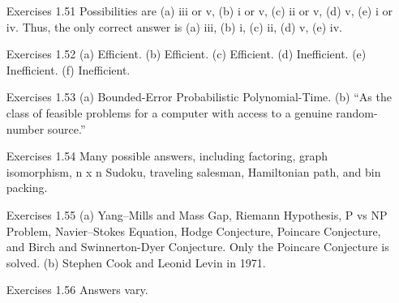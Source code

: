 \documentclass{article}
\begin{document}
\begin{enumerate}
\item[Exercises 1.51] Possibilities are (a) iii or v, (b) i or v, (c) ii or v, (d) v, (e) i or iv. Thus, the only correct answer is (a) iii, (b) i, (c) ii, (d) v, (e) iv.

\item[Exercises 1.52] (a) Efficient. (b) Efficient. (c) Efficient. (d) Inefficient. (e) Inefficient. (f) Inefficient.

\item[Exercises 1.53] (a) Bounded-Error Probabilistic Polynomial-Time. (b) “As the class of feasible problems for a computer with access to a genuine random-number source.”

\item[Exercises 1.54] Many possible answers, including factoring, graph isomorphism, n x n Sudoku, traveling salesman, Hamiltonian path, and bin packing.

\item[Exercises 1.55] (a) Yang–Mills and Mass Gap, Riemann Hypothesis, P vs NP Problem, Navier–Stokes Equation, Hodge Conjecture, Poincare Conjecture, and Birch and Swinnerton-Dyer Conjecture. Only the Poincare Conjecture is solved. (b) Stephen
Cook and Leonid Levin in 1971.

\item[Exercises 1.56]Answers vary.
    
\end{enumerate}
\end{document}
